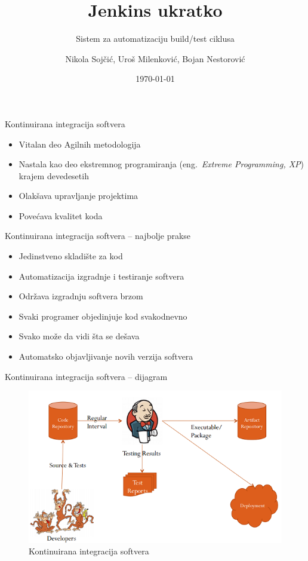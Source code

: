 \documentclass[10pt]{beamer}
\title{Jenkins ukratko}
\subtitle{Sistem za automatizaciju build/test ciklusa}
\date{\today}
\author{Nikola Sojčić, Uroš Milenković, Bojan Nestorović}
\institute{Matematički fakultet, Univerzitet u Beogradu}
\begin{document}
\maketitle

\begin{frame}[fragile]{Kontinuirana integracija softvera}
    \begin{itemize}
    	\item Vitalan deo Agilnih metodologija
	\item Nastala kao deo ekstremnog programiranja (eng.~{\em Extreme Programming, XP}) krajem devedesetih
	\item Olakšava upravljanje projektima
	\item Povećava kvalitet koda
    \end{itemize}
\end{frame}

\begin{frame}[fragile]{Kontinuirana integracija softvera -- najbolje prakse}
    \begin{itemize}
    	\item Jedinstveno skladište za kod
	\item Automatizacija izgradnje i testiranje softvera
	\item Održava izgradnju softvera brzom
	\item Svaki programer objedinjuje kod svakodnevno
	\item Svako može da vidi šta se dešava
	\item Automatsko objavljivanje novih verzija softvera
    \end{itemize}
\end{frame}

\begin{frame}{Kontinuirana integracija softvera -- dijagram}
  \begin{figure}
    \includegraphics[scale=0.55]{workflow.png}
    \caption{Kontinuirana integracija softvera}
  \end{figure}
\end{frame}
\end{document}
